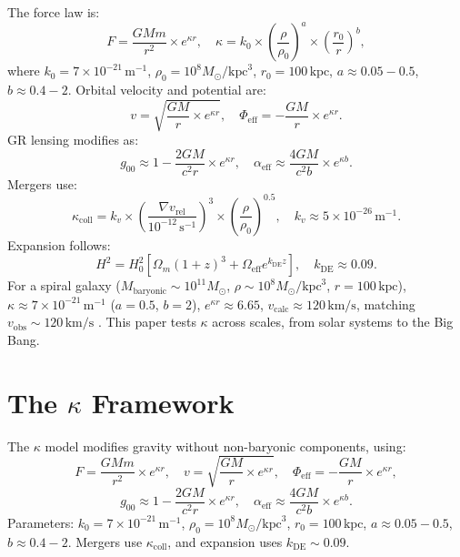 \documentclass[a4paper,12pt]{article}
\begin{document}
The force law is:
\begin{equation}
F = \frac{G M m}{r^2} \times e^{\kappa r}, \quad \kappa = k_0 \times \left( \frac{\rho}{\rho_0} \right)^a \times \left( \frac{r_0}{r} \right)^b,
\end{equation}
where $k_0 = 7 \times 10^{-21} \, \text{m}^{-1}$, $\rho_0 = 10^8 M_\odot/\text{kpc}^3$, $r_0 = 100 \, \text{kpc}$, $a \approx 0.05-0.5$, $b \approx 0.4-2$. Orbital velocity and potential are:
\begin{equation}
v = \sqrt{\frac{G M}{r} \times e^{\kappa r}}, \quad \Phi_\text{eff} = -\frac{G M}{r} \times e^{\kappa r}.
\end{equation}
GR lensing modifies as:
\begin{equation}
g_{00} \approx 1 - \frac{2 G M}{c^2 r} \times e^{\kappa r}, \quad \alpha_\text{eff} \approx \frac{4 G M}{c^2 b} \times e^{\kappa b}.
\end{equation}
Mergers use:
\begin{equation}
\kappa_{\text{coll}} = k_v \times \left( \frac{\nabla v_\text{rel}}{10^{-12} \, \text{s}^{-1}} \right)^3 \times \left( \frac{\rho}{\rho_0} \right)^{0.5}, \quad k_v \approx 5 \times 10^{-26} \, \text{m}^{-1}.
\end{equation}
Expansion follows:
\begin{equation}
H^2 = H_0^2 \left[ \Omega_m (1+z)^3 + \Omega_\text{eff} e^{k_\text{DE} z} \right], \quad k_\text{DE} \approx 0.09.
\end{equation}
For a spiral galaxy ($M_\text{baryonic} \sim 10^{11} M_\odot$, $\rho \sim 10^8 M_\odot/\text{kpc}^3$, $r = 100 \, \text{kpc}$), $\kappa \approx 7 \times 10^{-21} \, \text{m}^{-1}$ ($a = 0.5$, $b = 2$), $e^{\kappa r} \approx 6.65$, $v_\text{calc} \approx 120 \, \text{km/s}$, matching $v_\text{obs} \sim 120 \, \text{km/s}$ \citep{Rubin1970}. This paper tests $\kappa$ across scales, from solar systems to the Big Bang.

\section{The \texorpdfstring{$\kappa$}{kappa} Framework}
The $\kappa$ model modifies gravity without non-baryonic components, using:
\begin{equation}
F = \frac{G M m}{r^2} \times e^{\kappa r}, \quad v = \sqrt{\frac{G M}{r} \times e^{\kappa r}}, \quad \Phi_\text{eff} = -\frac{G M}{r} \times e^{\kappa r},
\end{equation}
\begin{equation}
g_{00} \approx 1 - \frac{2 G M}{c^2 r} \times e^{\kappa r}, \quad \alpha_\text{eff} \approx \frac{4 G M}{c^2 b} \times e^{\kappa b}.
\end{equation}
Parameters: $k_0 = 7 \times 10^{-21} \, \text{m}^{-1}$, $\rho_0 = 10^8 M_\odot/\text{kpc}^3$, $r_0 = 100 \, \text{kpc}$, $a \approx 0.05-0.5$, $b \approx 0.4-2$. Mergers use $\kappa_{\text{coll}}$, and expansion uses $k_\text{DE} \sim 0.09$.
\end{document}
